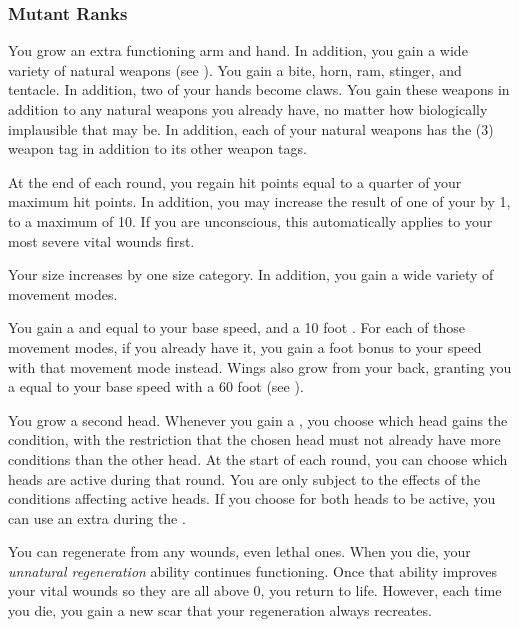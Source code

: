     \subsubsection{Mutant Ranks}
       You grow an extra functioning arm and hand.
      In addition, you gain a wide variety of natural weapons (see ).
      You gain a bite, horn, ram, stinger, and tentacle.
      In addition, two of your hands become claws.
      You gain these weapons in addition to any natural weapons you already have, no matter how biologically implausible that may be.
      In addition, each of your natural weapons has the  (3) weapon tag in addition to its other weapon tags.

       At the end of each round, you regain hit points equal to a quarter of your maximum hit points.
      In addition, you may increase the result of one of your  by 1, to a maximum of 10.
      If you are unconscious, this automatically applies to your most severe vital wounds first.

       Your size increases by one size category.
      In addition, you gain a wide variety of movement modes.

      You gain a  and  equal to your base speed, and a 10 foot .
      For each of those movement modes, if you already have it, you gain a  foot bonus to your speed with that movement mode instead.
      Wings also grow from your back, granting you a  equal to your base speed with a 60 foot  (see ).

       You grow a second head.
      Whenever you gain a , you choose which head gains the condition, with the restriction that the chosen head must not already have more conditions than the other head.
      At the start of each round, you can choose which heads are active during that round.
      You are only subject to the effects of the conditions affecting active heads.
      If you choose for both heads to be active, you can use an extra  during the .

       You can regenerate from any wounds, even lethal ones.
      When you die, your \textit{unnatural regeneration} ability continues functioning.
      Once that ability improves your vital wounds so they are all above 0, you return to life.
      However, each time you die, you gain a new scar that your regeneration always recreates.

